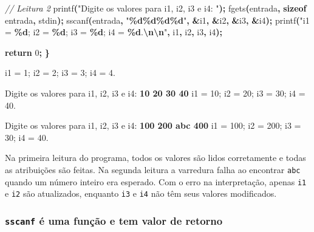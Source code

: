 \documentclass[
  11pt,
  a4paper,
]{scrbook}
\newenvironment{Shaded}{\begin{snugshade}}{\end{snugshade}}
\newcommand{\CommentTok}[1]{\textcolor[rgb]{0.56,0.35,0.01}{\textit{#1}}}
\newcommand{\ControlFlowTok}[1]{\textcolor[rgb]{0.13,0.29,0.53}{\textbf{#1}}}
\newcommand{\DecValTok}[1]{\textcolor[rgb]{0.00,0.00,0.81}{#1}}
\newcommand{\KeywordTok}[1]{\textcolor[rgb]{0.13,0.29,0.53}{\textbf{#1}}}
\newcommand{\NormalTok}[1]{#1}
\newcommand{\OperatorTok}[1]{\textcolor[rgb]{0.81,0.36,0.00}{\textbf{#1}}}
\newcommand{\SpecialCharTok}[1]{\textcolor[rgb]{0.81,0.36,0.00}{\textbf{#1}}}
\newcommand{\StringTok}[1]{\textcolor[rgb]{0.31,0.60,0.02}{#1}}
\begin{document}
\begin{Shaded}
\begin{Highlighting}[]
    \CommentTok{// Leitura 2}
\NormalTok{    printf}\OperatorTok{(}\StringTok{"Digite os valores para i1, i2, i3 e i4: "}\OperatorTok{);}
\NormalTok{    fgets}\OperatorTok{(}\NormalTok{entrada}\OperatorTok{,} \KeywordTok{sizeof}\NormalTok{ entrada}\OperatorTok{,}\NormalTok{ stdin}\OperatorTok{);}
\NormalTok{    sscanf}\OperatorTok{(}\NormalTok{entrada}\OperatorTok{,} \StringTok{"}\SpecialCharTok{\%d\%d\%d\%d}\StringTok{"}\OperatorTok{,} \OperatorTok{\&}\NormalTok{i1}\OperatorTok{,} \OperatorTok{\&}\NormalTok{i2}\OperatorTok{,} \OperatorTok{\&}\NormalTok{i3}\OperatorTok{,} \OperatorTok{\&}\NormalTok{i4}\OperatorTok{);}
\NormalTok{    printf}\OperatorTok{(}\StringTok{"i1 = }\SpecialCharTok{\%d}\StringTok{; i2 = }\SpecialCharTok{\%d}\StringTok{; i3 = }\SpecialCharTok{\%d}\StringTok{; i4 = }\SpecialCharTok{\%d}\StringTok{.}\SpecialCharTok{\textbackslash{}n\textbackslash{}n}\StringTok{"}\OperatorTok{,}\NormalTok{ i1}\OperatorTok{,}\NormalTok{ i2}\OperatorTok{,}\NormalTok{ i3}\OperatorTok{,}\NormalTok{ i4}\OperatorTok{);}

    \ControlFlowTok{return} \DecValTok{0}\OperatorTok{;}
\OperatorTok{\}}
\end{Highlighting}
\end{Shaded}

\begin{Shaded}
\begin{Highlighting}[]
\NormalTok{i1 = 1; i2 = 2; i3 = 3; i4 = 4.}

\NormalTok{Digite os valores para i1, i2, i3 e i4: }\KeywordTok{ 10 20 30 40 }
\NormalTok{i1 = 10; i2 = 20; i3 = 30; i4 = 40.}

\NormalTok{Digite os valores para i1, i2, i3 e i4: }\KeywordTok{ 100 200 abc 400 }
\NormalTok{i1 = 100; i2 = 200; i3 = 30; i4 = 40.}
\end{Highlighting}
\end{Shaded}

Na primeira leitura do programa, todos os valores são lidos corretamente
e todas as atribuições são feitas. Na segunda leitura a varredura falha
ao encontrar \texttt{abc} quando um número inteiro era esperado. Com o
erro na interpretação, apenas \texttt{i1} e \texttt{i2} são atualizados,
enquanto \texttt{i3} e \texttt{i4} não têm seus valores modificados.

\subsubsection{\texorpdfstring{\texttt{sscanf} é uma função e tem valor
de
retorno}{sscanf é uma função e tem valor de retorno}}\label{sscanf-uxe9-uma-funuxe7uxe3o-e-tem-valor-de-retorno}
\end{document}
